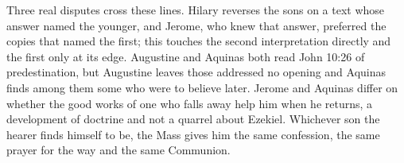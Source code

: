 Three real disputes cross these lines. Hilary reverses the sons on a text whose
answer named the younger, and Jerome, who knew that answer, preferred the
copies that named the first; this touches the second interpretation directly
and the first only at its edge. Augustine and Aquinas both read John 10:26 of
predestination, but Augustine leaves those addressed no opening and Aquinas
finds among them some who were to believe later. Jerome and Aquinas differ on
whether the good works of one who falls away help him when he returns, a
development of doctrine and not a quarrel about Ezekiel. Whichever son the
hearer finds himself to be, the Mass gives him the same confession, the same
prayer for the way and the same Communion.
